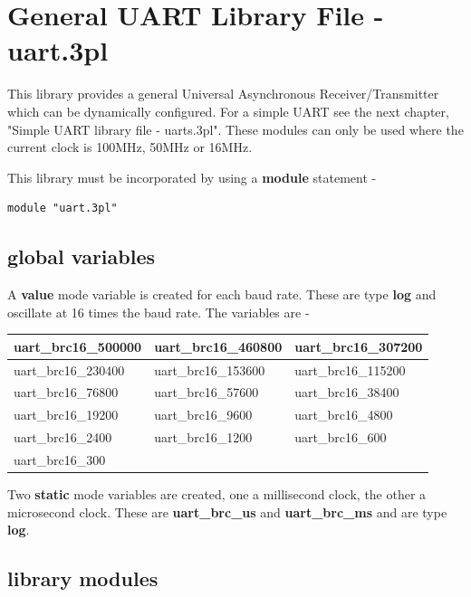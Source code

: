 \pagebreak

\section{General UART Library File - uart.3pl}

    This library provides a general Universal Asynchronous Receiver/Transmitter
    which can be dynamically configured. For a simple UART see the next
    chapter, "Simple UART library file - uarts.3pl". These modules can only be
    used where the current clock is 100MHz, 50MHz or 16MHz.
    
    This library must be incorporated by using a {\bf module} statement -
    \begin{lstlisting}[gobble=4, language=threepl]
       module "uart.3pl"
    \end{lstlisting}

    \subsection{global variables}

        A {\bf value} mode variable is created for each baud rate.
        These are type {\bf log} and oscillate at 16 times the baud
        rate. The variables are -

        \begin{tabular}{| l l l |}
        \hline
        uart\_brc16\_500000 & uart\_brc16\_460800 & uart\_brc16\_307200 \\ \hline
        uart\_brc16\_230400 & uart\_brc16\_153600 & uart\_brc16\_115200 \\ \hline
        uart\_brc16\_76800  & uart\_brc16\_57600  & uart\_brc16\_38400  \\ \hline
        uart\_brc16\_19200  & uart\_brc16\_9600   & uart\_brc16\_4800   \\ \hline
        uart\_brc16\_2400   & uart\_brc16\_1200   & uart\_brc16\_600    \\ \hline 
        uart\_brc16\_300    &                   &                   \\ \hline  
        \end{tabular}

        Two {\bf static} mode variables are created, one a millisecond clock,
        the other a microsecond clock. These are {\bf uart\_brc\_us} and
        {\bf uart\_brc\_ms} and are type {\bf log}.

    \subsection{library modules}

